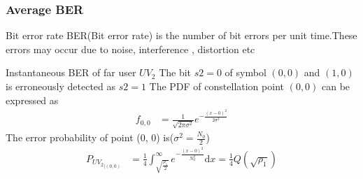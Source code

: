 \documentclass{beamer}
\begin{document}
\begin{frame}

\end{frame}




\begin{frame}
\frametitle{Average BER}
\begin{block}{Bit error rate}
BER(Bit error rate) is the number of bit errors per unit time.These errors may occur due to noise, interference , distortion etc
\end{block}
\begin{block}{Instantaneous BER of far user $UV_2$}
The bit $s2 = 0$ of symbol $(0, 0)$ and $(1, 0)$ is erroneously detected as $s2 = 1$ 
The PDF of constellation point $(0, 0)$ can be expressed as 
\begin{align}
f_{0,0}&=\frac{1}{\sqrt{2 \pi \sigma^2}}e^{-\frac{(x-0)^2}{2 \sigma^2}}
\end{align}
The error probability of point (0, 0) is($\sigma^2=\frac{N_0}{2}$)
\begin{align}
P_{{UV_2}_{|(0,0)}} &= \frac{1}{4} \int_{\sqrt{\frac{{\rho_1}}{2}}}^\infty e^{-\frac{(x-0)^2}{N_0^2}} \mathrm{d}x  =  \frac{1}{4}  Q(\sqrt{\rho_1})
\end{align}
\end{block}
\end{frame}
\end{document}
